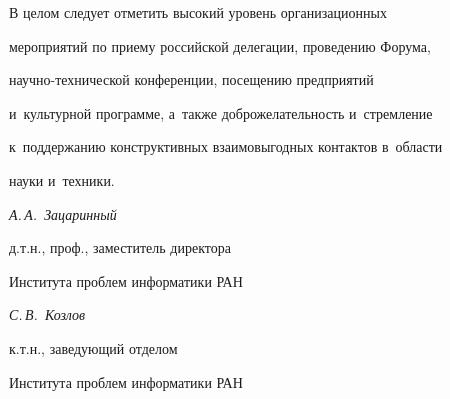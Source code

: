       В целом следует отметить высокий уровень организационных


мероприятий по приему российской делегации, проведению Форума,


      на\-уч\-но-тех\-ни\-че\-ской конференции, посещению предприятий


и~культурной программе, а~так\-же доброжелательность и~стремление


к~поддержанию конструктивных взаимовыгодных контактов в~области


науки и~техники.










    \vspace*{7mm}





\hfill \textit{А.\,А.~Зацаринный}





\hfill д.т.н., проф., заместитель директора





\hfill Института проблем информатики РАН





\vspace*{0.5mm}





\hfill \textit{С.\,В.~Козлов}





\hfill к.т.н., заведующий отделом





\hfill Института проблем информатики РАН








\def\rightkol{Научные контакты}


\def\leftkol{Научные контакты}


